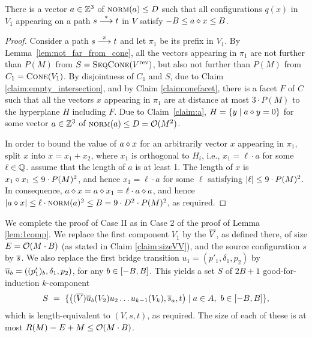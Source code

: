 \begin{appendixproof}
%
\begin{claim} \label{claim:axgen}
There is a vector $a\in\mathbb{Z}^3$ of $\textsc{norm}(a)\leq D$ such that
all configurations $q(x)$ in $V_1$ appearing on a path $s\stackrel{*}{\longrightarrow} t$ in $V$ satisfy
$-B \leq a \diamond x \leq B$.
\end{claim}
%
\begin{proof}
Consider a path $s \stackrel{\pi}{\longrightarrow} t$ and let $\pi_1$ be its prefix in $V_1$.
By Lemma~\ref{lem:not_far_from_cone}, all the vectors appearing in $\pi_1$ are not further than $P(M)$ from 
$S=\textsc{SeqCone}({V}^{\text{rev}})$, but also not further than $P(M)$ from $C_1 = \textsc{Cone}(V_1)$.
By disjointness of $C_1$ and $S$, due to Claim \ref{claim:empty_intersection}, 
and by Claim \ref{claim:onefacet},
there is a facet $F$ of $C$ such that
all the vectors $x$ appearing in $\pi_1$ are at distance at most  $3\cdot P(M)$ to
the hyperplane $H$ including $F$.
%
Due to Claim~\ref{claim:a}, $H=\{y \mid a \diamond y = 0\}$ for some
vector $a \in \mathbb{Z}^3$ of $\textsc{norm}(a) \leq D={\cal O}(M^2)$.

In order to bound the value of $a \diamond x$ for an arbitrarily vector $x$ appearing in $\pi_1$,
split $x$ into $x = x_1 + x_2$, where $x_1$ is orthogonal to $H_i$, i.e., $x_1 = \ell \cdot a$ for some $\ell\in\mathbb{Q}$.
\Wlog assume that the length of $a$ is at least 1.
The length of $x$  is $x_1 \diamond x_1\leq 9\cdot P(M)^2$, and hence
$x_1 = \ell \cdot a$ for some $\ell$ satisfying $|\ell| \leq 9\cdot P(M)^2$.
In consequence,  $a \diamond x = a \diamond x_1 = \ell \cdot a \diamond a$,
and hence $|a \diamond x| \leq \ell \cdot \textsc{norm}(a)^2 \leq B= 9\cdot D^2 \cdot P(M)^2$, as required.
%
\end{proof}
%
We complete the proof of Case II as in Case 2 of the proof of Lemma \ref{lem:1comp}.
We replace the first component $V_1$ by the \geomvass $\overline{V}$, as defined there,
of size $E = {\cal O}(M\cdot B)$ (as stated in Claim \ref{claim:sizeVV}),
and the source configuration $s$ by $\overline{s}$.
We also replace the first bridge transition $u_1 = (p'_1, \delta_1, p_2)$ by
$\overline{u}_{b} = ((p'_1)_{b}, \delta_1, p_2)$, for any $b\in[-B, B]$.
This yields a set $S$ of $2B+1$ good-for-induction $k$-component \tvass
\[
S \ = \ \{\big((\overline{V}) \overline{u}_{b} (V_2) u_2 \ldots u_{k-1} (V_k), \overline{s}_a, t \big) \mid a\in A, \ b\in [-B, B]\},
\]
which is length-equivalent to $(V, s, t)$, as required. 
The size of each of these \tvass is at most $R(M) = E+M \leq {\cal O}(M \cdot B)$.
%
\end{appendixproof}

